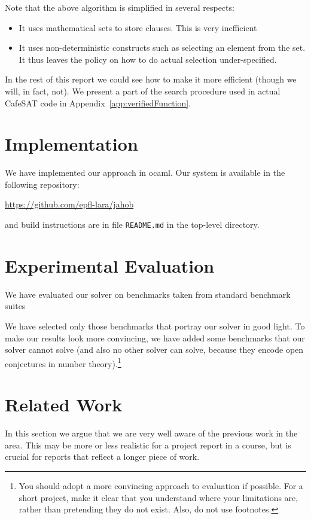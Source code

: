 \documentclass[a4paper,UKenglish,cleveref, autoref, thm-restate]{lipics-v2021}
\begin{document}
Note that the above algorithm is simplified in several respects:
\begin{itemize}
\item It uses mathematical sets to store clauses. This is very inefficient
\item It uses non-deterministic constructs such as selecting an element from the set. It thus leaves the policy on how to do actual selection under-specified.
\end{itemize}
In the rest of this report we could see how to make it more efficient (though we will, in fact, not).
We present a part of the search procedure used in actual CafeSAT code in Appendix~\ref{app:verifiedFunction}.

\section{Implementation}

We have implemented our approach in ocaml. Our system is available in the following repository:
\begin{center}
  \url{https://github.com/epfl-lara/jahob}
\end{center}
and build instructions are in file \verb|README.md| in the top-level directory.

\section{Experimental Evaluation}

We have evaluated our solver on benchmarks taken from standard benchmark suites~\cite{DBLP:conf/fm/HojjatKGIKR12,
  Sut17,
  BarFT-SMTLIB,
  10.1007/978-3-030-45237-7_21}
  
We have selected only those benchmarks that portray our
solver in good light. To make our results look more
convincing, we have added some benchmarks that our solver
cannot solve (and also no other solver can solve, because
they encode open conjectures in number theory).\footnote{You should adopt a more convincing
  approach to evaluation if possible. For a short project, make it clear that you understand
  where your limitations are, rather than pretending they do not exist. Also, do not use footnotes.}

\section{Related Work}

In this section we argue that we are very well aware of the previous work in the area.
This may be more or less realistic for a project report in a course, but is crucial for reports that
reflect a longer piece of work.
\end{document}
